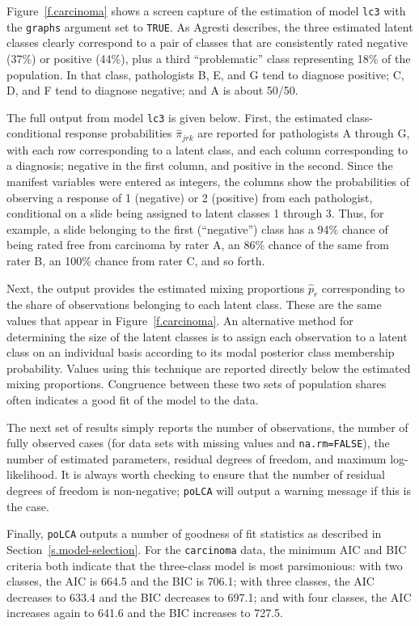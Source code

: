 \documentclass[letterpaper,12pt]{article}
\begin{document}
Figure~\ref{f.carcinoma} shows a screen capture of the estimation of model \texttt{lc3} with the \texttt{graphs} argument set to \texttt{TRUE}. As Agresti describes, the three estimated latent classes clearly correspond to a pair of classes that are consistently rated negative (37\%) or positive (44\%), plus a third ``problematic'' class representing 18\% of the population. In that class, pathologists B, E, and G tend to diagnose positive; C, D, and F tend to diagnose negative; and A is about 50/50.

The full output from model \texttt{lc3} is given below.  First, the estimated class-conditional response probabilities $\hat \pi_{jrk}$ are reported for pathologists A through G, with each row corresponding to a latent class, and each column corresponding to a diagnosis; negative in the first column, and positive in the second.  Since the manifest variables were entered as integers, the columns show the probabilities of observing a response of 1 (negative) or 2 (positive) from each pathologist, conditional on a slide being assigned to latent classes 1 through 3. Thus, for example, a slide belonging to the first (``negative'') class has a 94\% chance of being rated free from carcinoma by rater A, an 86\% chance of the same from rater B, an 100\% chance from rater C, and so forth.

Next, the output provides the estimated mixing proportions $\hat p_r$ corresponding to the share of observations belonging to each latent class.  These are the same values that appear in Figure~\ref{f.carcinoma}.  An alternative method for determining the size of the latent classes is to assign each observation to a latent class on an individual basis according to its modal posterior class membership probability.  Values using this technique are reported directly below the estimated mixing proportions.  Congruence between these two sets of population shares often indicates a good fit of the model to the data.

The next set of results simply reports the number of observations, the number of fully observed cases (for data sets with missing values and \texttt{na.rm=FALSE}), the number of estimated parameters, residual degrees of freedom, and maximum log-likelihood.  It is always worth checking to ensure that the number of residual degrees of freedom is non-negative; \texttt{poLCA} will output a warning message if this is the case.

Finally, \texttt{poLCA} outputs a number of goodness of fit statistics as described in Section~\ref{s.model-selection}.  For the \texttt{carcinoma} data, the minimum AIC and BIC criteria both indicate that the three-class model is most parsimonious: with two classes, the AIC is 664.5 and the BIC is 706.1; with three classes, the AIC decreases to 633.4 and the BIC decreases to 697.1; and with four classes, the AIC increases again to 641.6 and the BIC increases to 727.5.
\end{document}
